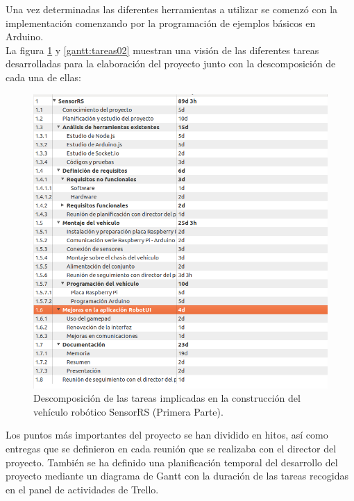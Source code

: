 Una vez determinadas las diferentes herramientas a utilizar se comenzó con la implementación comenzando por la programación de ejemplos básicos en Arduino.\\

La figura \ref{gantt:tareas01} y \ref{gantt:tareas02} muestran una visión de las diferentes tareas desarrolladas para la elaboración del proyecto junto con la descomposición de cada una de ellas:\\

\begin{figure}
  \begin{center}
    \includegraphics[scale=0.6]{imagenes/planificacion/descomposicion_tareas01.png}
  \end{center}
  \caption{Descomposición de las tareas implicadas en la construcción del vehículo robótico SensorRS (Primera Parte).}
  \label{gantt:tareas01}
\end{figure}

Los puntos más importantes del proyecto se han dividido en hitos, así como entregas que se definieron en cada reunión que se realizaba con el director del proyecto. 
También se ha definido una planificación temporal del desarrollo del proyecto mediante un diagrama de Gantt con la duración de las tareas recogidas en el panel de actividades de Trello.\\
\newpage

